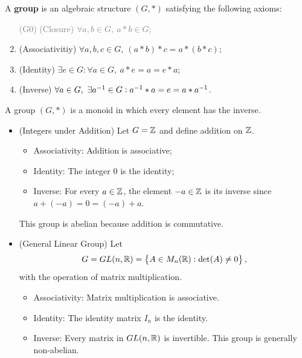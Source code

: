 \documentclass[11pt,openany]{article}
\begin{document}
\begin{remark}
A \textbf{group} is an algebraic structure $(G,*)$ satisfying the following axioms:
\begin{enumerate}[(G1)]
	\item[\textcolor{gray}{(G0)}] \textcolor{gray}{(Closure) $\forall a,b\in G,\ a*b\in G$;}
	\item (Associativitiy) $\forall a,b,c\in G,\ (a*b)*c=a*(b*c)$;
	\item (Identity) $\exists e\in G:\forall a\in G,\ a*e=a=e*a$;
	\item (Inverse) $\forall a\in G,\ \exists\inv{a}\in G:\inv{a}*a=e=a*\inv{a}$.
\end{enumerate}
\end{remark}
\begin{example}
A group $(G,*)$ is a monoid in which every element has the inverse. \begin{itemize}
	\item (Integers under Addition) Let $G=\mathbb{Z}$ and define addition on $\mathbb{Z}$. \begin{itemize}
		\item Associativity: Addition is associative;
		\item Identity: The integer $0$ is the identity;
		\item Inverse: For every $a\in\mathbb{Z}$, the element $-a\in\mathbb{Z}$ is its inverse since $a+(-a)=0=(-a)+a$. 
	\end{itemize}
	This group is abelian because addition is commutative.
	\item (General Linear Group) Let \[
	G=GL(n,\mathbb{R})=\set{A\in M_n(\mathbb{R}):\det(A)\neq 0},
	\] with the operation of matrix multiplication. \begin{itemize}
		\item Associativity: Matrix multiplication is associative.
		\item Identity: The identity matrix $I_n$ is the identity.
		\item Inverse: Every matrix in $GL(n,\mathbb{R})$ is invertible. This group is generally non-abelian.
	\end{itemize}
\end{itemize}
\end{example}
\end{document}
